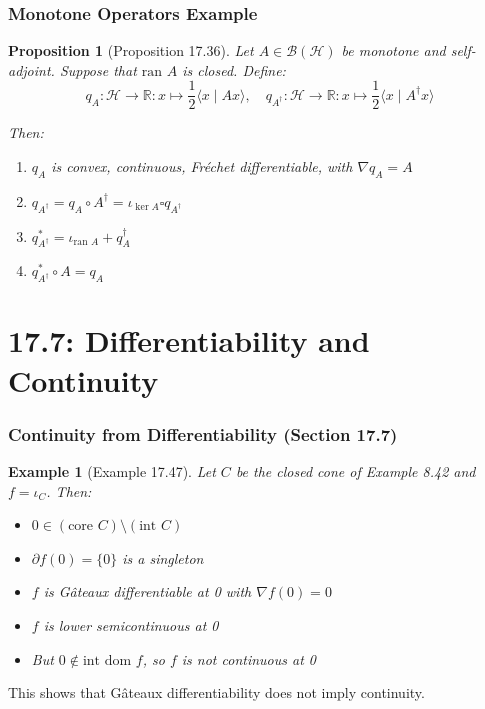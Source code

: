 \documentclass[aspectratio=169,10pt]{beamer}
\newtheorem{prop}{Proposition}
\newtheorem{exmpl}{Example}
\begin{document}
\begin{frame}
  \frametitle{Monotone Operators Example}

  \begin{prop}[Proposition 17.36]
    Let $A \in \mathcal{B}(\mathcal{H})$ be monotone and self-adjoint. Suppose that $\text{ran } A$ is closed. Define:
    \[
    q_A: \mathcal{H} \to \mathbb{R}: x \mapsto \frac{1}{2} \langle x \mid Ax \rangle, \quad q_{A^\dagger}: \mathcal{H} \to \mathbb{R}: x \mapsto \frac{1}{2} \langle x \mid A^\dagger x \rangle
    \]

    Then:
    \begin{enumerate}
      \item[(i)] $q_A$ is convex, continuous, Fréchet differentiable, with $\nabla q_A = A$
      \item[(ii)] $q_{A^\dagger} = q_A \circ A^\dagger = \iota_{\ker A} \square q_{A^\dagger}$
      \item[(iii)] $q_{A^\dagger}^* = \iota_{\text{ran } A} + q_A^\dagger$
      \item[(iv)] $q_{A^\dagger}^* \circ A = q_A$
    \end{enumerate}
  \end{prop}
\end{frame}

\section{17.7: Differentiability and Continuity}
\begin{frame}
  \frametitle{Continuity from Differentiability (Section 17.7)}

  \begin{exmpl}[Example 17.47]
    Let $C$ be the closed cone of Example 8.42 and $f = \iota_C$. Then:
    \begin{itemize}
      \item $0 \in (\text{core } C) \setminus (\text{int } C)$
      \item $\partial f(0) = \{0\}$ is a singleton
      \item $f$ is Gâteaux differentiable at 0 with $\nabla f(0) = 0$
      \item $f$ is lower semicontinuous at 0
      \item But $0 \notin \text{int dom } f$, so $f$ is not continuous at 0
    \end{itemize}
  \end{exmpl}

  This shows that Gâteaux differentiability does not imply continuity.
\end{frame}
\end{document}
